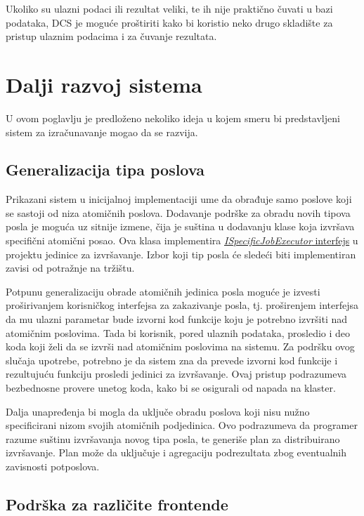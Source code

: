 \documentclass[12pt,oneside]{memoir}
\begin{document}
Ukoliko su ulazni podaci ili rezultat veliki, te ih nije praktično čuvati u bazi podataka, DCS je moguće proštiriti kako bi koristio neko drugo skladište za pristup ulaznim podacima i za čuvanje rezultata.

\section{Dalji razvoj sistema}
U ovom poglavlju je predloženo nekoliko ideja u kojem smeru bi predstavljeni sistem za izračunavanje mogao da se razvija.

\subsection{Generalizacija tipa poslova}

Prikazani sistem u inicijalnoj implementaciji ume da obrađuje samo poslove koji se sastoji od niza atomičnih poslova. Dodavanje podrške za obradu novih tipova posla je moguća uz sitnije izmene, čija je suština u dodavanju klase koja izvršava specifični atomični posao. Ova klasa implementira \href{https://github.com/milana-kovacevic/DistributedComputationSystem/blob/main/src/ComputeNode/Executors/ISpecificJobExecutor.cs}{\emph{ISpecificJobExecutor} interfejs} u projektu jedinice za izvršavanje. Izbor koji tip posla će sledeći biti implementiran zavisi od potražnje na tržištu.

Potpunu generalizaciju obrade atomičnih jedinica posla moguće je izvesti proširivanjem korisničkog interfejsa za zakazivanje posla, tj. proširenjem interfejsa da mu ulazni parametar bude izvorni kod funkcije koju je potrebno izvršiti nad atomičnim poslovima. Tada bi korisnik, pored ulaznih podataka, prosledio i deo koda koji želi da se izvrši nad atomičnim poslovima na sistemu. Za podršku ovog slučaja upotrebe, potrebno je da sistem zna da prevede izvorni kod funkcije i rezultujuću funkciju prosledi jedinici za izvršavanje. Ovaj pristup podrazumeva bezbednosne provere unetog koda, kako bi se osigurali od napada na klaster.

Dalja unapređenja bi mogla da uključe obradu poslova koji nisu nužno specificirani nizom svojih atomičnih podjedinica. Ovo podrazumeva da programer razume suštinu izvršavanja novog tipa posla, te generiše plan za distribuirano izvršavanje. Plan može da uključuje i agregaciju podrezultata zbog eventualnih zavisnosti potposlova.


\subsection{Podrška za različite frontende}
\end{document}
